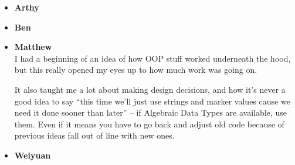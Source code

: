 
\begin{itemize}
\item {\bf Arthy}\\

\item {\bf Ben}\\

\item {\bf Matthew}\\
I had a beginning of an idea of how OOP stuff worked underneath the hood, but this really opened my eyes up to how much work was going on.

It also taught me a lot about making design decisions, and how it's never a good idea to say ``this time we'll just use strings and marker values cause we need it done sooner than later'' -- if Algebraic Data Types are available, use them. Even if it means you 
have to go back and adjust old code because of previous ideas fall out of line with new ones.


\item {\bf Weiyuan}\\

\end{itemize}
